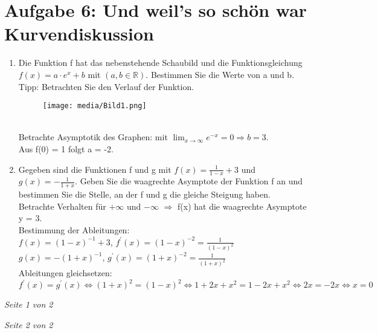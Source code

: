 \documentclass[11pt,a4paper, parskip=half ]{report}
\begin{document}
\section*{Aufgabe 6: Und weil's so schön war Kurvendiskussion}
\begin{enumerate}
  \item Die Funktion f  hat das nebenstehende Schaubild und die	Funktionsgleichung $f(x) = a\cdot e^x + b$ mit $(a,b \in \mathbb{R})$. Bestimmen Sie die Werte von a und b. Tipp: Betrachten Sie den Verlauf der Funktion.
  \begin{figure}
    \texttt{[image: media/Bild1.png]}
  \end{figure}
  \vspace{20pt}
  \\Betrachte Asymptotik des Graphen: mit $\lim_{x\rightarrow\infty} e^{-x} = 0 \Rightarrow b = 3$.
  \\Aus f(0) = 1 folgt a = -2.	
  \item Gegeben sind die Funktionen f und g mit $f(x) = \frac{1}{1-x}+3$ und $g(x)=-\frac{1}{1+x}$.	Geben Sie die waagrechte Asymptote der Funktion f an und bestimmen Sie die Stelle, an der f und g  die gleiche Steigung haben.
  \vspace{20pt}
  \\Betrachte Verhalten für $+\infty$ und $-\infty$ $\Rightarrow$ f(x) hat die waagrechte Asymptote y = 3.
  \\Bestimmung der Ableitungen:	
  \\$f(x) = (1-x)^{-1}+3$, $f^{\prime}(x) = (1-x)^{-2} = \frac{1}{(1-x)^2}$ 
  \\$g(x) = -(1+x)^{-1}$, $g^{\prime}(x) = (1+x)^{-2} = \frac{1}{(1+x)^2}$      
  \\Ableitungen gleichsetzen:
  \\$f^{\prime}(x) = g^{\prime}(x)   \Leftrightarrow 	(1+x)^2 = (1-x)^2 \Leftrightarrow 1+2x+x^2 = 1-2x+x^2 \Leftrightarrow 2x = -2x \Leftrightarrow x = 0$	

\end{enumerate}
 
\vfill
\begin{flushright}\textit{Seite 1 von 2}\end{flushright}\newpage



\vfill
\begin{flushright}\textit{Seite 2 von 2}\end{flushright}%
\end{document}
